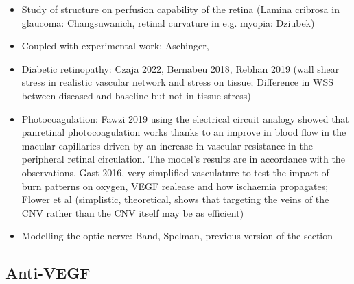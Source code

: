 \documentclass[12pt,a4paper]{journal}
\begin{document}
\begin{itemize}
\item Study of structure on perfusion capability of the retina (Lamina cribrosa in glaucoma: Changsuwanich, retinal curvature in e.g. myopia: Dziubek)
\item Coupled with experimental work: Aschinger,
\item Diabetic retinopathy: Czaja 2022, Bernabeu 2018, Rebhan 2019 (wall shear stress in realistic vascular network and stress on tissue; Difference in WSS between diseased and baseline but not in tissue stress)
\item Photocoagulation: Fawzi 2019 using the electrical circuit analogy showed that panretinal photocoagulation works thanks to an improve in blood flow in the macular capillaries driven by an increase in vascular resistance in the peripheral retinal circulation. The model's results are in accordance with the observations. Gast 2016, very simplified vasculature to test the impact of burn patterns on oxygen, VEGF realease and how ischaemia propagates; Flower et al (simplistic, theoretical, shows that targeting the veins of the CNV rather than the CNV itself may be as efficient)
\item Modelling the optic nerve: Band, Spelman, previous version of the section
\end{itemize}







\subsection*{Anti-VEGF}
\end{document}
